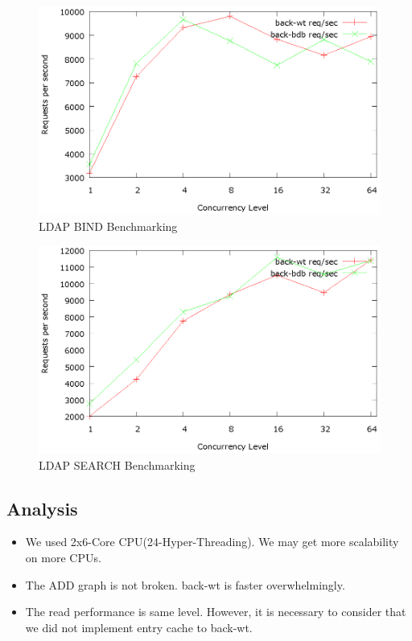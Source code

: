 \documentclass[a4paper
,12
,twocolumn
]{article}
\begin{document}
\begin{figure}[H]
\centering
\includegraphics[width=0.9\columnwidth]{benchmark/bind.eps}
\caption{LDAP BIND Benchmarking}
\end{figure}

\begin{figure}[H]
\centering
\includegraphics[width=0.9\columnwidth]{benchmark/search.eps}
\caption{LDAP SEARCH Benchmarking}
\end{figure}

\subsection{Analysis}\label{analysis}

\begin{itemize}
\itemsep1pt\parskip0pt
\item
  We used 2x6-Core CPU(24-Hyper-Threading). We may get more scalability
  on more CPUs.
\item
  The ADD graph is not broken. back-wt is faster overwhelmingly.
\item
  The read performance is same level. However, it is necessary to
  consider that we did not implement entry cache to back-wt.
\end{itemize}
\end{document}
